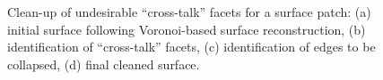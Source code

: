 \begin{figure}[ht]
{\label{fig:cross1-2}}		
%
\caption{Clean-up of undesirable ``cross-talk'' facets for a surface patch: (a) initial surface following Voronoi-based surface reconstruction, (b) identification of ``cross-talk'' facets, (c) identification of edges to be collapsed, (d) final cleaned surface.}
\label{fig:cross1}
\end{figure}

